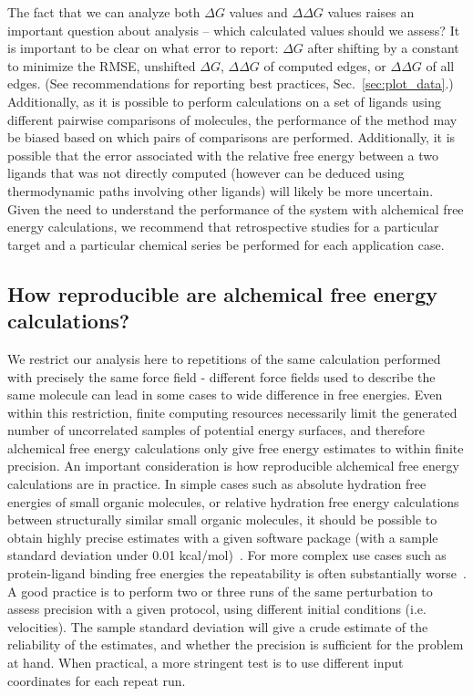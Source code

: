 \documentclass[9pt,bestpractices]{livecoms}
\begin{document}
The fact that we can analyze both $\Delta G$ values and $\Delta \Delta G$ values raises an important question about analysis -- which calculated values should we assess? It is important to be clear on what error to report: $\Delta G$ after shifting by a constant to minimize the RMSE, unshifted $\Delta G$, $\Delta \Delta G$ of computed edges, or $\Delta \Delta G$ of all edges. (See recommendations for reporting best practices, Sec.~\ref{sec:plot_data}.) Additionally, as it is possible to perform calculations on a set of ligands using different pairwise comparisons of molecules, the performance of the method may be biased based on which pairs of comparisons are performed. Additionally, it is possible that the error associated with the relative free energy between a two ligands that was not directly computed (however can be deduced using thermodynamic paths involving other ligands) will likely be more uncertain.
Given the need to understand the performance of the system with alchemical free energy calculations, we recommend that retrospective studies for a particular target and a particular chemical series be performed for each application case.

\subsection{How reproducible are alchemical free energy calculations?}
\label{subsec:reproducible}
We restrict our analysis here to repetitions of the same calculation performed with precisely the same force field - different force fields used to describe the same molecule can lead in some cases to wide difference in free energies.  Even within this restriction,
finite computing resources necessarily limit the generated number of uncorrelated samples of potential energy surfaces, and therefore alchemical free energy calculations only give free energy estimates to within finite precision. An important consideration is how reproducible alchemical free energy calculations are in practice. In simple cases such as absolute hydration free energies of small organic molecules, or relative hydration free energy calculations between structurally similar small organic molecules, it should be possible to obtain highly precise estimates with a given software package (with a sample standard deviation under 0.01 kcal/mol)~\cite{rizzi2019sampl6}.
For more complex use cases such as protein-ligand binding free energies the repeatability is often substantially worse~\cite{rizzi2019sampl6}. A good practice is to perform two or three runs of the same perturbation to assess precision with a given protocol, using different initial conditions (i.e. velocities). The sample standard deviation will give a crude estimate of the reliability of the estimates, and whether the precision is sufficient for the problem at hand. When practical, a more stringent test is to use different input coordinates for each repeat run. 
\end{document}
